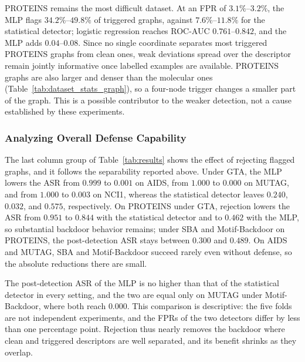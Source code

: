 \documentclass[journal]{IEEEtran}
\begin{document}
PROTEINS remains the most difficult dataset. At an FPR of $3.1\%$--$3.2\%$, the
MLP flags $34.2\%$--$49.8\%$ of triggered graphs, against $7.6\%$--$11.8\%$ for
the statistical detector; logistic regression reaches ROC-AUC
$0.761$--$0.842$, and the MLP adds $0.04$--$0.08$. Since no single coordinate
separates most triggered PROTEINS graphs from clean ones, weak deviations
spread over the descriptor remain jointly informative once labelled examples
are available. PROTEINS graphs are also larger and denser than the molecular
ones (Table~\ref{tab:dataset_stats_graph}), so a four-node trigger changes a
smaller part of the graph. This is a possible contributor to the weaker
detection, not a cause established by these experiments.

\subsubsection{Analyzing Overall Defense Capability}\label{sec:res-defense}
The last column group of Table~\ref{tab:results} shows the effect of rejecting
flagged graphs, and it follows the separability reported above. Under GTA, the
MLP lowers the ASR from $0.999$ to $0.001$ on AIDS, from $1.000$ to $0.000$ on
MUTAG, and from $1.000$ to $0.003$ on NCI1, whereas the statistical detector
leaves $0.240$, $0.032$, and $0.575$, respectively. On PROTEINS under GTA,
rejection lowers the ASR from $0.951$ to $0.844$ with the statistical detector
and to $0.462$ with the MLP, so substantial backdoor behavior remains; under
SBA and Motif-Backdoor on PROTEINS, the post-detection ASR stays between
$0.300$ and $0.489$. On AIDS and MUTAG, SBA and Motif-Backdoor succeed rarely
even without defense, so the absolute reductions there are small.

The post-detection ASR of the MLP is no higher than that of the statistical
detector in every setting, and the two are equal only on MUTAG under
Motif-Backdoor, where both reach $0.000$. This comparison is descriptive: the
five folds are not independent experiments, and the FPRs of the two detectors
differ by less than one percentage point. Rejection thus nearly removes the
backdoor where clean and triggered descriptors are well separated, and its
benefit shrinks as they overlap.

\end{document}
